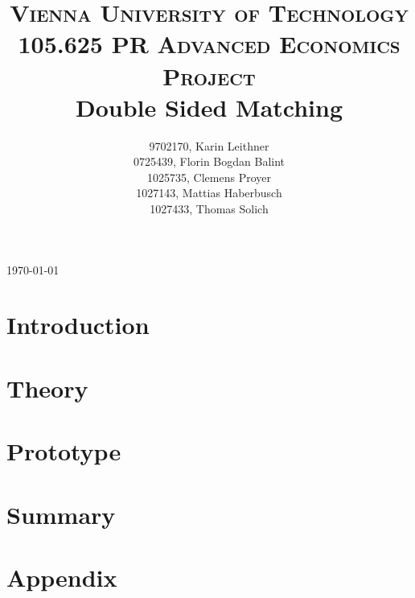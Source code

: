 \documentclass[11pt,english]{article}
\title{
	\usefont{OT1}{bch}{b}{n}
	\normalfont \normalsize \textsc{Vienna University of Technology} \\ [25pt]
	\normalfont \normalsize \textsc{105.625 PR Advanced Economics Project} \\ [25pt]
	\huge Double Sided Matching
}
\author{
  9702170, Karin Leithner\\
  0725439, Florin Bogdan Balint\\
  1025735, Clemens Proyer\\
  1027143, Mattias Haberbusch\\
  1027433, Thomas Solich\\
}
\numberwithin{equation}{section}%
\numberwithin{figure}{section}%
\numberwithin{table}{section}%
\begin{document}
\begin{titlepage}
	\begin{center}
		\thetitle
		\vspace{2cm}
	\end{center}
	\begin{flushleft}
	\vfill
	\theauthor
	\end{flushleft}
	\begin{center}
		\vspace{2cm}
		{\large \today\par}
	\end{center}
\end{titlepage}

\setlength{\cftbeforesecskip}{9pt}
\tableofcontents

\newpage

\section{Introduction}


\section{Theory}


\section{Prototype}


%

%

\section{Summary}


\section{Appendix}


\newpage
\listoffigures


\newpage



\end{document}
